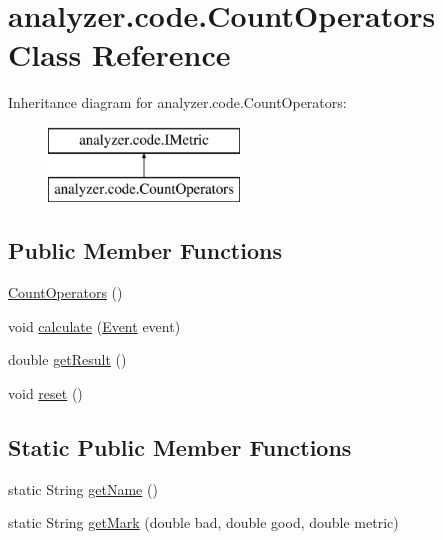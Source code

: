 \hypertarget{classanalyzer_1_1code_1_1CountOperators}{}\section{analyzer.\+code.\+Count\+Operators Class Reference}
\label{classanalyzer_1_1code_1_1CountOperators}
Inheritance diagram for analyzer.\+code.\+Count\+Operators\+:\begin{figure}[H]
\begin{center}
\leavevmode
\includegraphics[height=2.000000cm]{classanalyzer_1_1code_1_1CountOperators}
\end{center}
\end{figure}
\subsection*{Public Member Functions}
\begin{DoxyCompactItemize}
\item 
\hyperlink{classanalyzer_1_1code_1_1CountOperators_a35cd40aef8c6e9b31aa51b667b7e3367}{Count\+Operators} ()
\item 
void \hyperlink{classanalyzer_1_1code_1_1CountOperators_a0dc10beb196cf80583707cbe4049eae2}{calculate} (\hyperlink{classanalyzer_1_1code_1_1Event}{Event} event)
\item 
double \hyperlink{classanalyzer_1_1code_1_1CountOperators_ab5d3d7000eaaa974536c967ceee9dcc7}{get\+Result} ()
\item 
void \hyperlink{classanalyzer_1_1code_1_1CountOperators_ad068949f06b712b55f12b03673a99278}{reset} ()
\end{DoxyCompactItemize}
\subsection*{Static Public Member Functions}
\begin{DoxyCompactItemize}
\item 
static String \hyperlink{classanalyzer_1_1code_1_1CountOperators_adce2eacc351b1a2c7d244a712d078477}{get\+Name} ()
\item 
static String \hyperlink{classanalyzer_1_1code_1_1CountOperators_aa89a8387e3c44af558eccf0733a98230}{get\+Mark} (double bad, double good, double metric)
\end{DoxyCompactItemize}


